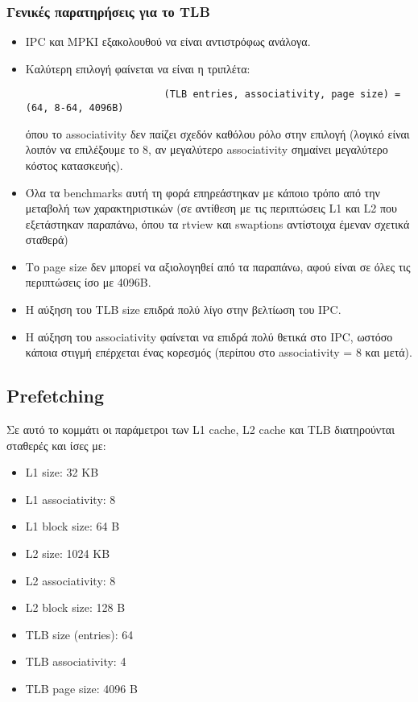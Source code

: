 \documentclass[12pt,a4paper]{article}
\begin{document}
			\subsubsection{Γενικές παρατηρήσεις για το TLB}
				\begin{itemize}
					\item IPC και MPKI εξακολουθού να είναι αντιστρόφως ανάλογα.
					\item Καλύτερη επιλογή φαίνεται να είναι η τριπλέτα:
					
					\begin{verbatim}
						(TLB entries, associativity, page size) = (64, 8-64, 4096B)
					\end{verbatim}
					
					όπου το associativity δεν παίζει σχεδόν καθόλου ρόλο στην επιλογή (λογικό είναι λοιπόν να επιλέξουμε το 8, αν μεγαλύτερο associativity σημαίνει μεγαλύτερο κόστος κατασκευής).
					
					\item Όλα τα benchmarks αυτή τη φορά επηρεάστηκαν με κάποιο τρόπο από την μεταβολή των χαρακτηριστικών (σε αντίθεση με τις περιπτώσεις L1 και L2 που εξετάστηκαν παραπάνω, όπου τα rtview και swaptions αντίστοιχα έμεναν σχετικά σταθερά)
					\item Το page size δεν μπορεί να αξιολογηθεί από τα παραπάνω, αφού είναι σε όλες τις περιπτώσεις ίσο με 4096B.
					\item Η αύξηση του TLB size επιδρά πολύ λίγο στην βελτίωση του IPC.
					\item Η αύξηση του associativity φαίνεται να επιδρά πολύ θετικά στο IPC, ωστόσο κάποια στιγμή επέρχεται ένας κορεσμός (περίπου στο associativity = 8 και μετά).
				\end{itemize}
		
		\subsection{Prefetching}
			Σε αυτό το κομμάτι οι παράμετροι των L1 cache, L2 cache και TLB διατηρούνται σταθερές και ίσες με:
			
			\begin{itemize}
				\item L1 size: 32 KB
				\item L1 associativity: 8
				\item L1 block size: 64 B
				\item L2 size: 1024 KB
				\item L2 associativity: 8 
				\item L2 block size: 128 B
				\item TLB size (entries): 64 
				\item TLB associativity: 4
				\item TLB page size: 4096 B
			\end{itemize}
			
\end{document}
